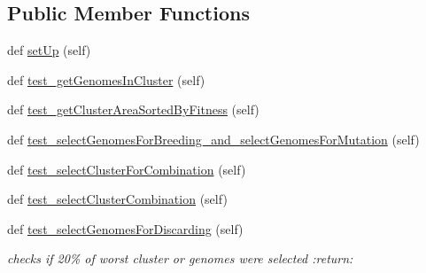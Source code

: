 \subsection*{Public Member Functions}
\begin{DoxyCompactItemize}
\item 
def \hyperlink{classNEAT__PyGenetics_1_1NEAT_1_1Tests_1_1AnalystTests_1_1test__genomeSelector_1_1test__genomeSelector_a73634e74c61c8367095ed89b1a9ffa8d}{set\+Up} (self)
\item 
def \hyperlink{classNEAT__PyGenetics_1_1NEAT_1_1Tests_1_1AnalystTests_1_1test__genomeSelector_1_1test__genomeSelector_abf45d8dbc127efe9b7a89415b2f0b605}{test\+\_\+get\+Genomes\+In\+Cluster} (self)
\item 
def \hyperlink{classNEAT__PyGenetics_1_1NEAT_1_1Tests_1_1AnalystTests_1_1test__genomeSelector_1_1test__genomeSelector_a845cb361d31d78f62c573610a01c9c52}{test\+\_\+get\+Cluster\+Area\+Sorted\+By\+Fitness} (self)
\item 
def \hyperlink{classNEAT__PyGenetics_1_1NEAT_1_1Tests_1_1AnalystTests_1_1test__genomeSelector_1_1test__genomeSelector_abe868724b36a1423c915ca001bdfacb7}{test\+\_\+select\+Genomes\+For\+Breeding\+\_\+and\+\_\+select\+Genomes\+For\+Mutation} (self)
\item 
def \hyperlink{classNEAT__PyGenetics_1_1NEAT_1_1Tests_1_1AnalystTests_1_1test__genomeSelector_1_1test__genomeSelector_a02f6228ac878117e968633e7d0652e37}{test\+\_\+select\+Cluster\+For\+Combination} (self)
\item 
def \hyperlink{classNEAT__PyGenetics_1_1NEAT_1_1Tests_1_1AnalystTests_1_1test__genomeSelector_1_1test__genomeSelector_a1a32ff097226fd39d70886ef046293d4}{test\+\_\+select\+Cluster\+Combination} (self)
\item 
def \hyperlink{classNEAT__PyGenetics_1_1NEAT_1_1Tests_1_1AnalystTests_1_1test__genomeSelector_1_1test__genomeSelector_a5c10235f34e1e4e56e06ad1c17d787c5}{test\+\_\+select\+Genomes\+For\+Discarding} (self)
\begin{DoxyCompactList}\small\item\em checks if 20\% of worst cluster or genomes were selected \+:return\+: \end{DoxyCompactList}\end{DoxyCompactItemize}

